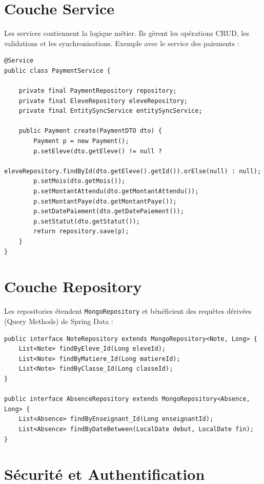 \documentclass[12pt,a4paper,twoside]{report}
\begin{document}
\section{Couche Service}

Les services contiennent la logique métier. Ils gèrent les opérations CRUD, les validations et les synchronisations. Exemple avec le service des paiements :

\begin{lstlisting}[style=javaStyle, caption=PaymentService]
@Service
public class PaymentService {
    
    private final PaymentRepository repository;
    private final EleveRepository eleveRepository;
    private final EntitySyncService entitySyncService;

    public Payment create(PaymentDTO dto) {
        Payment p = new Payment();
        p.setEleve(dto.getEleve() != null ? 
            eleveRepository.findById(dto.getEleve().getId()).orElse(null) : null);
        p.setMois(dto.getMois());
        p.setMontantAttendu(dto.getMontantAttendu());
        p.setMontantPaye(dto.getMontantPaye());
        p.setDatePaiement(dto.getDatePaiement());
        p.setStatut(dto.getStatut());
        return repository.save(p);
    }
}
\end{lstlisting}

\section{Couche Repository}

Les repositories étendent \texttt{MongoRepository} et bénéficient des requêtes dérivées (Query Methods) de Spring Data :

\begin{lstlisting}[style=javaStyle, caption=Exemples de repositories]
public interface NoteRepository extends MongoRepository<Note, Long> {
    List<Note> findByEleve_Id(Long eleveId);
    List<Note> findByMatiere_Id(Long matiereId);
    List<Note> findByClasse_Id(Long classeId);
}

public interface AbsenceRepository extends MongoRepository<Absence, Long> {
    List<Absence> findByEnseignant_Id(Long enseignantId);
    List<Absence> findByDateBetween(LocalDate debut, LocalDate fin);
}
\end{lstlisting}

\section{Sécurité et Authentification}
\end{document}

